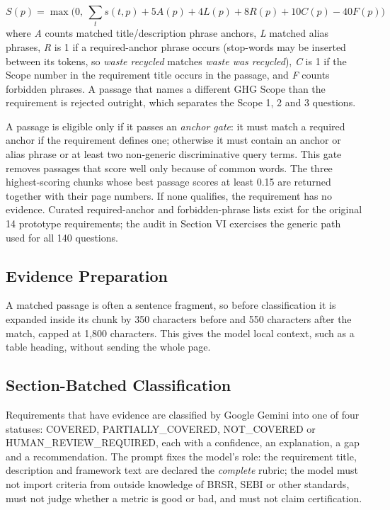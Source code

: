 \documentclass[conference]{IEEEtran}
\begin{document}
\begin{equation}S(p)=\max\!\Big(0,\ \sum_t s(t,p)+5A(p)+4L(p)+8R(p)+10C(p)-40F(p)\Big)\end{equation}
where \textit{A} counts matched title/description phrase anchors, \textit{L} matched alias phrases, \textit{R} is 1 if a required-anchor phrase occurs (stop-words may be inserted between its tokens, so \textit{waste recycled} matches \textit{waste was recycled}), \textit{C} is 1 if the Scope number in the requirement title occurs in the passage, and \textit{F} counts forbidden phrases. A passage that names a different GHG Scope than the requirement is rejected outright, which separates the Scope 1, 2 and 3 questions.

A passage is eligible only if it passes an \textit{anchor gate}: it must match a required anchor if the requirement defines one; otherwise it must contain an anchor or alias phrase or at least two non-generic discriminative query terms. This gate removes passages that score well only because of common words. The three highest-scoring chunks whose best passage scores at least 0.15 are returned together with their page numbers. If none qualifies, the requirement has no evidence. Curated required-anchor and forbidden-phrase lists exist for the original 14 prototype requirements; the audit in Section VI exercises the generic path used for all 140 questions.

\subsection{Evidence Preparation}
A matched passage is often a sentence fragment, so before classification it is expanded inside its chunk by 350 characters before and 550 characters after the match, capped at 1,800 characters. This gives the model local context, such as a table heading, without sending the whole page.

\subsection{Section-Batched Classification}
Requirements that have evidence are classified by Google Gemini \cite{b11} into one of four statuses: COVERED, PARTIALLY\_COVERED, NOT\_COVERED or HUMAN\_REVIEW\_REQUIRED, each with a confidence, an explanation, a gap and a recommendation. The prompt fixes the model's role: the requirement title, description and framework text are declared the \textit{complete} rubric; the model must not import criteria from outside knowledge of BRSR, SEBI or other standards, must not judge whether a metric is good or bad, and must not claim certification.
\end{document}
